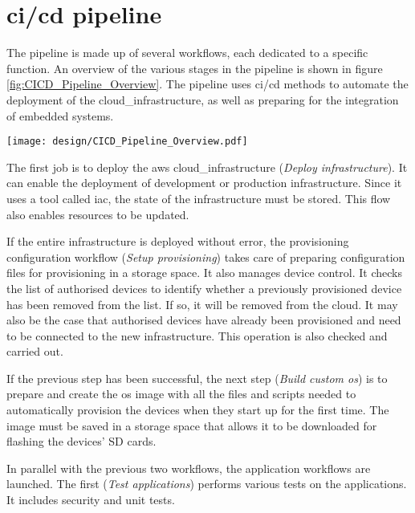 \section{\texorpdfstring{\acrshort{ci}/\acrshort{cd}}{} pipeline}

The pipeline is made up of several workflows, each dedicated to a specific function. An overview of the various stages in the pipeline is shown in figure \ref{fig:CICD_Pipeline_Overview}. The pipeline uses \acrshort{ci}/\acrshort{cd} methods to automate the deployment of the \gls{cloud_infrastructure}, as well as preparing for the integration of embedded systems.
\begin{center}
    \begingroup
    \texttt{[image: design/CICD\_Pipeline\_Overview.pdf]}
    \label{fig:CICD_Pipeline_Overview}
    \endgroup
\end{center}
The first job is to deploy the \gls{aws} \gls{cloud_infrastructure} (\textit{Deploy infrastructure}). It can enable the deployment of development or production infrastructure. Since it uses a tool called \acrshort{iac}, the state of the infrastructure must be stored. This flow also enables resources to be updated.

If the entire infrastructure is deployed without error, the \gls{provisioning} configuration workflow (\textit{Setup \gls{provisioning}}) takes care of preparing configuration files for \gls{provisioning} in a storage space. It also manages device control. It checks the list of authorised devices to identify whether a previously provisioned device has been removed from the list. If so, it will be removed from the \gls{cloud}. It may also be the case that authorised devices have already been provisioned and need to be connected to the new infrastructure. This operation is also checked and carried out.

If the previous step has been successful, the next step (\textit{Build custom \acrshort{os}}) is to prepare and create the \acrshort{os} image with all the files and scripts needed to automatically provision the devices when they start up for the first time. The image must be saved in a storage space that allows it to be downloaded for flashing the devices' SD cards.

In parallel with the previous two workflows, the application workflows are launched. The first (\textit{Test applications}) performs various tests on the applications. It includes security and unit tests.

